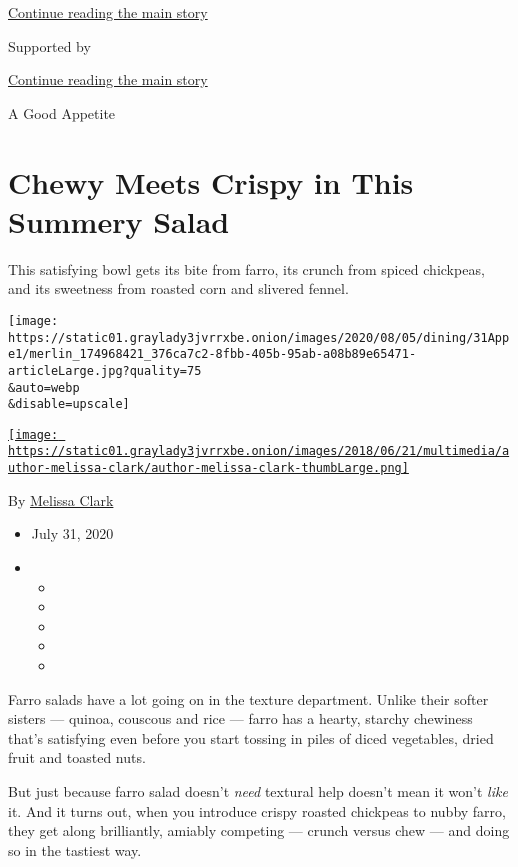 \protect\hyperlink{after-top}{Continue reading the main story}

Supported by

\protect\hyperlink{after-sponsor}{Continue reading the main story}

A Good Appetite

\hypertarget{chewy-meets-crispy-in-this-summery-salad}{%
\section{Chewy Meets Crispy in This Summery
Salad}\label{chewy-meets-crispy-in-this-summery-salad}}

This satisfying bowl gets its bite from farro, its crunch from spiced
chickpeas, and its sweetness from roasted corn and slivered fennel.

\texttt{[image: https://static01.graylady3jvrrxbe.onion/images/2020/08/05/dining/31Appe1/merlin\_174968421\_376ca7c2-8fbb-405b-95ab-a08b89e65471-articleLarge.jpg?quality=75\\\&auto=webp\\\&disable=upscale]}

\href{https://www.nytimes3xbfgragh.onion/by/melissa-clark}{\texttt{[image: https://static01.graylady3jvrrxbe.onion/images/2018/06/21/multimedia/author-melissa-clark/author-melissa-clark-thumbLarge.png]}}

By \href{https://www.nytimes3xbfgragh.onion/by/melissa-clark}{Melissa
Clark}

\begin{itemize}
\item
  July 31, 2020
\item
  \begin{itemize}
  \item
  \item
  \item
  \item
  \item
  \end{itemize}
\end{itemize}

Farro salads have a lot going on in the texture department. Unlike their
softer sisters --- quinoa, couscous and rice --- farro has a hearty,
starchy chewiness that's satisfying even before you start tossing in
piles of diced vegetables, dried fruit and toasted nuts.

But just because farro salad doesn't \emph{need} textural help doesn't
mean it won't \emph{like} it. And it turns out, when you introduce
crispy roasted chickpeas to nubby farro, they get along brilliantly,
amiably competing --- crunch versus chew --- and doing so in the
tastiest way.

